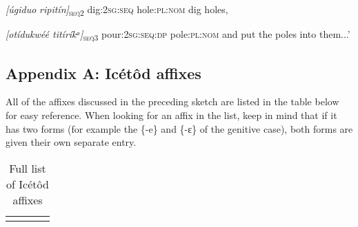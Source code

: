 \begin{table}
\textit{[úgidu}\textit{o}\textit{   ripitín]}\textsc{\textsubscript{seq2}}
dig:\textsc{2sg:seq}   hole:\textsc{pl:nom}
dig holes,



\textit{[otíduk}\textit{w}\textit{éé     titíríkᵃ]}\textsc{\textsubscript{seq3}}
pour:\textsc{2sg:seq:dp   }pole:\textsc{pl:nom}
and put the poles into them...’


\subsection{Appendix A: Icétôd affixes}

All of the affixes discussed in the preceding sketch are listed in the table below for easy reference. When looking for an affix in the list, keep in mind that if it has two forms (for example the \{-e\} and \{-ɛ\} of the genitive case), both forms are given their own separate entry.

\begin{table}
\caption{ Full list of Icétôd affixes}

\begin{tabularx}{\textwidth}{XXXX}
\lsptoprule


\end{tabularx}
\end{table}
\end{table}
